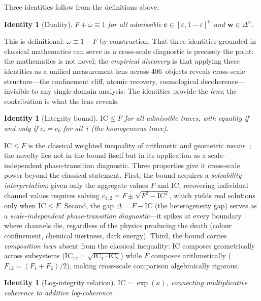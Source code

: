 \documentclass[
  aps,
  prx,
  twocolumn,
  superscriptaddress,
  nofootinbib,
  floatfix
]{revtex4-2}
\newcommand{\eps}{\varepsilon}
\newcommand{\IC}{\mathrm{IC}}
\newcommand{\tvec}{\mathbf{c}}
\newcommand{\wvec}{\mathbf{w}}
\newtheorem{identity}[theorem]{Identity}
\begin{document}
Three identities follow from the definitions above:

\begin{identity}[Duality]
\label{id:duality}
$F + \omega \equiv 1$ for all admissible $\tvec \in [\eps, 1{-}\eps]^n$
and $\wvec \in \Delta^n$.
\end{identity}

This is definitional: $\omega \equiv 1 - F$ by construction.
That three identities grounded in classical mathematics can serve as
a cross-scale diagnostic is precisely the point: the mathematics is
not novel; the \emph{empirical discovery} is that applying these
identities as a unified measurement lens across 406~objects reveals
cross-scale structure---the confinement cliff, atomic recovery,
cosmological decoherence---invisible to any single-domain analysis.
The identities provide the \emph{lens}; the contribution is what
the lens reveals.

\begin{identity}[Integrity bound]
\label{id:bound}
$\IC \leq F$ for all admissible traces, with equality if and only if
$c_i = c_0$ for all~$i$ (the homogeneous trace).
\end{identity}

$\IC \leq F$ is the classical weighted inequality of arithmetic and
geometric means~\cite{hardylittlewoodpolya1952}; the novelty lies
not in the bound itself but in its application as a
scale-independent phase-transition diagnostic.
Three properties give it cross-scale power beyond the classical
statement. First, the bound acquires a \emph{solvability
interpretation}: given only the aggregate values $F$ and $\IC$,
recovering individual channel values requires solving
$c_{1,2} = F \pm \sqrt{F^2 - \IC^2}$, which yields real solutions
only when $\IC \leq F$. Second, the gap $\Delta = F - \IC$
(the heterogeneity gap) serves as a \emph{scale-independent
phase-transition diagnostic}---it spikes at every boundary where
channels die, regardless of the physics producing the death
(colour confinement, chemical inertness, dark energy).
Third, the bound carries \emph{composition laws} absent
from the classical inequality: $\IC$ composes geometrically across
subsystems ($\IC_{12} = \sqrt{\IC_1 \cdot \IC_2}$) while $F$
composes arithmetically ($F_{12} = (F_1 + F_2)/2$), making
cross-scale comparison algebraically rigorous.

\begin{identity}[Log-integrity relation]
\label{id:logint}
$\IC = \exp(\kappa)$, connecting multiplicative coherence to
additive log-coherence.
\end{identity}
\end{document}
